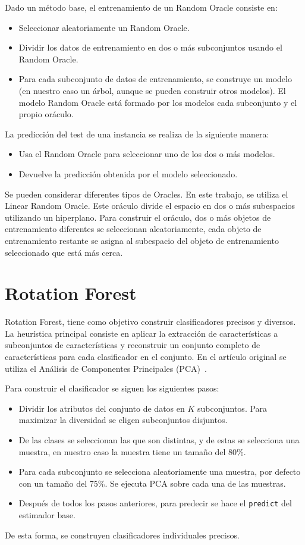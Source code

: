 Dado un método base, el entrenamiento de un Random Oracle consiste en:
\begin{itemize}

	\item Seleccionar aleatoriamente un Random Oracle.
	\item Dividir los datos de entrenamiento en dos o más subconjuntos usando el Random Oracle.
	\item Para cada subconjunto de datos de entrenamiento, se construye un modelo (en nuestro caso un árbol, aunque se pueden construir otros modelos). El modelo Random Oracle está formado por los modelos cada subconjunto y el propio oráculo.
\end{itemize}
La predicción del test de una instancia se realiza de la siguiente manera: 
\begin{itemize}
	\item Usa el Random Oracle para seleccionar uno de los dos o más modelos.
	\item Devuelve la predicción obtenida por el modelo seleccionado.
\end{itemize}

Se pueden considerar diferentes tipos de Oracles. En este trabajo, se utiliza el Linear Random Oracle. Este oráculo divide el espacio en dos o más subespacios utilizando un hiperplano. Para construir el oráculo, dos o más objetos de entrenamiento diferentes se seleccionan aleatoriamente, cada objeto de entrenamiento restante se asigna al subespacio del objeto de entrenamiento seleccionado que está más cerca.

\section{Rotation Forest}

Rotation Forest, tiene como objetivo construir clasificadores precisos y diversos. La heurística principal consiste en aplicar la extracción de características a subconjuntos de características y reconstruir un conjunto completo de características para cada clasificador en el conjunto. En el artículo original se utiliza el Análisis de Componentes Principales (PCA)~\cite{rotationforest}.

Para construir el clasificador se siguen los siguientes pasos:
\begin{itemize}
	\item Dividir los atributos del conjunto de datos en $K$ subconjuntos. Para maximizar la diversidad se eligen subconjuntos disjuntos.
	\item De las clases se seleccionan las que son distintas, y de estas se selecciona una muestra, en nuestro caso la muestra tiene un tamaño del 80\%.
	\item Para cada subconjunto se selecciona aleatoriamente una muestra, por defecto con un tamaño del 75\%. Se ejecuta PCA sobre cada una de las muestras.
	\item Después de todos los pasos anteriores, para predecir se hace el \texttt{predict} del estimador base.
\end{itemize}

De esta forma, se construyen clasificadores individuales precisos.